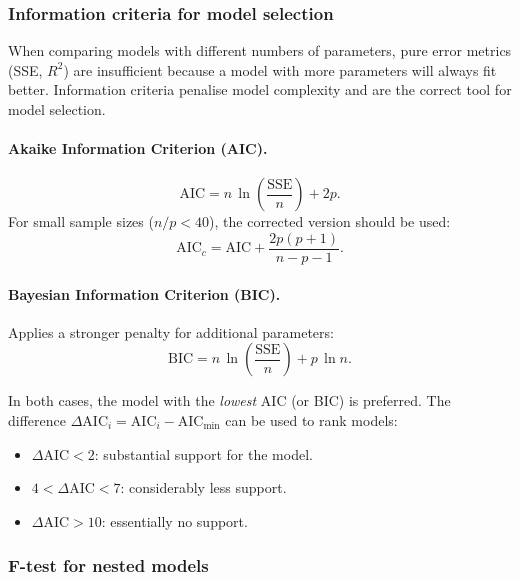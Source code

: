 \documentclass[12pt]{article}
\begin{document}
	\subsubsection{Information criteria for model selection}

	When comparing models with different numbers of parameters, pure
	error metrics (SSE, $R^{2}$) are insufficient because a model with
	more parameters will always fit better. Information criteria
	penalise model complexity and are the correct tool for model
	selection.

	\paragraph{Akaike Information Criterion (AIC).}
	\begin{equation}
		\mathrm{AIC}
		= n\,\ln\!\left(\frac{\mathrm{SSE}}{n}\right) + 2p.
		\label{eq:AIC}
	\end{equation}
	For small sample sizes ($n/p < 40$), the corrected version should
	be used:
	\begin{equation}
		\mathrm{AIC}_c
		= \mathrm{AIC} + \frac{2p(p+1)}{n - p - 1}.
		\label{eq:AICc}
	\end{equation}

	\paragraph{Bayesian Information Criterion (BIC).}
	Applies a stronger penalty for additional parameters:
	\begin{equation}
		\mathrm{BIC}
		= n\,\ln\!\left(\frac{\mathrm{SSE}}{n}\right)
		+ p\,\ln n.
		\label{eq:BIC}
	\end{equation}

	In both cases, the model with the \emph{lowest} AIC (or BIC) is
	preferred. The difference $\Delta\mathrm{AIC}_i = \mathrm{AIC}_i
	- \mathrm{AIC}_{\min}$ can be used to rank models:
	\begin{itemize}
		\item $\Delta\mathrm{AIC} < 2$: substantial support for
		the model.
		\item $4 < \Delta\mathrm{AIC} < 7$: considerably less support.
		\item $\Delta\mathrm{AIC} > 10$: essentially no support.
	\end{itemize}

	\subsubsection{F-test for nested models}
\end{document}
